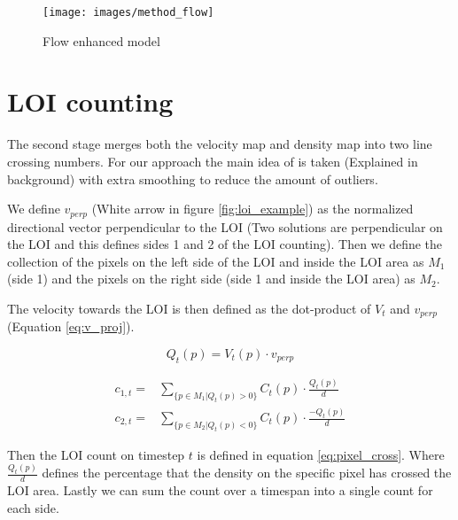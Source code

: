 \begin{figure}[h]
\centering
\texttt{[image: images/method\_flow]}
\caption{Flow enhanced model}
\label{fig:enhanced_model}
\end{figure}



\section{LOI counting}
The second stage merges both the velocity map and density map into two line crossing numbers. For our approach the main idea of \cite{leibe_crossing-line_2016} is taken (Explained in background) with extra smoothing to reduce the amount of outliers.

\label{sec:pixel_level}
We define $v_{perp}$ (White arrow in figure \ref{fig:loi_example}) as the normalized directional vector perpendicular to the LOI (Two solutions are perpendicular on the LOI and this defines sides 1 and 2 of the LOI counting). Then we define the collection of the pixels on the left side of the LOI and inside the LOI area as $M_1$ (side 1) and the pixels on the right side (side 1 and inside the LOI area) as $M_2$.

The velocity towards the LOI is then defined as the dot-product of $V_t$ and $v_{perp}$ (Equation \ref{eq:v_proj}).


\begin{equation}
	Q_t(p) = V_t(p) \cdot v_{perp}
	\label{eq:v_proj}
\end{equation}


\begin{equation}
\begin{aligned}
	c_{1,t} =& \sum_{\{p \in M_1 | Q_t(p) > 0\}} C_t(p) \cdot \frac{Q_t(p)}{d}\\
	c_{2,t} =& \sum_{\{p \in M_2 | Q_t(p) < 0\}} C_t(p) \cdot \frac{-Q_t(p)}{d}
\end{aligned}
\label{eq:pixel_cross}
\end{equation}

Then the LOI count on timestep $t$ is defined in equation \ref{eq:pixel_cross}. Where $\frac{Q_t(p)}{d}$ defines the percentage that the density on the specific pixel has crossed the LOI area. Lastly we can sum the count over a timespan into a single count for each side.

